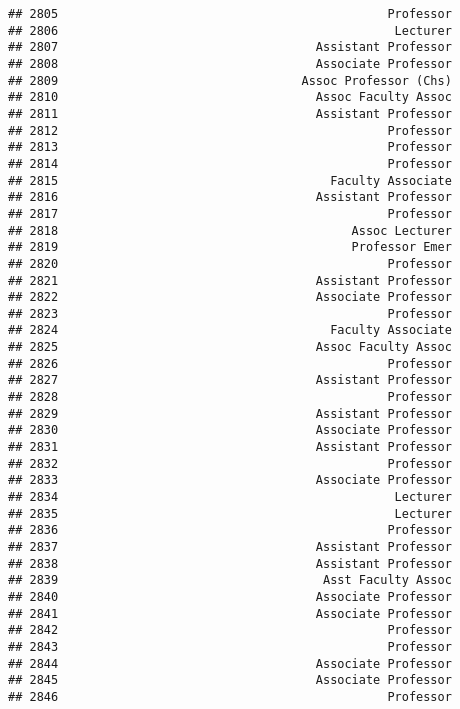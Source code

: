 \documentclass[
]{article}
\begin{document}
\begin{verbatim}
## 2805                                              Professor
## 2806                                               Lecturer
## 2807                                    Assistant Professor
## 2808                                    Associate Professor
## 2809                                  Assoc Professor (Chs)
## 2810                                    Assoc Faculty Assoc
## 2811                                    Assistant Professor
## 2812                                              Professor
## 2813                                              Professor
## 2814                                              Professor
## 2815                                      Faculty Associate
## 2816                                    Assistant Professor
## 2817                                              Professor
## 2818                                         Assoc Lecturer
## 2819                                         Professor Emer
## 2820                                              Professor
## 2821                                    Assistant Professor
## 2822                                    Associate Professor
## 2823                                              Professor
## 2824                                      Faculty Associate
## 2825                                    Assoc Faculty Assoc
## 2826                                              Professor
## 2827                                    Assistant Professor
## 2828                                              Professor
## 2829                                    Assistant Professor
## 2830                                    Associate Professor
## 2831                                    Assistant Professor
## 2832                                              Professor
## 2833                                    Associate Professor
## 2834                                               Lecturer
## 2835                                               Lecturer
## 2836                                              Professor
## 2837                                    Assistant Professor
## 2838                                    Assistant Professor
## 2839                                     Asst Faculty Assoc
## 2840                                    Associate Professor
## 2841                                    Associate Professor
## 2842                                              Professor
## 2843                                              Professor
## 2844                                    Associate Professor
## 2845                                    Associate Professor
## 2846                                              Professor

\end{verbatim}
\end{document}
